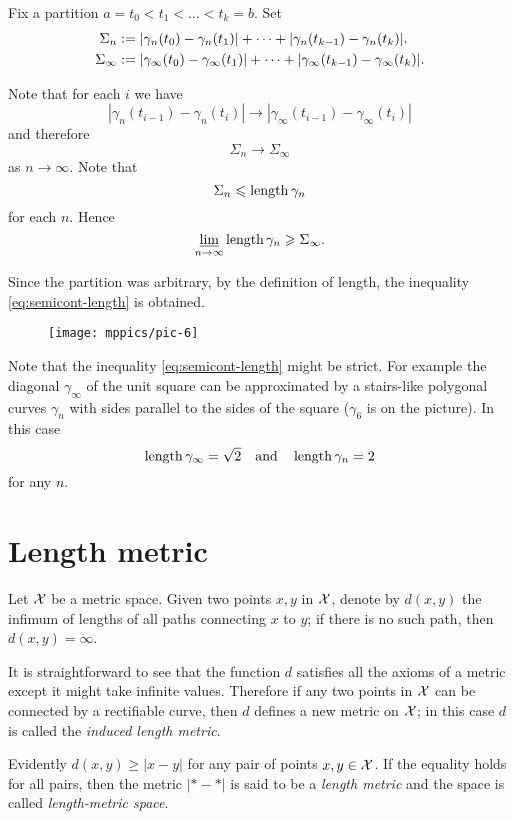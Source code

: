 Fix a partition $a=t_0<t_1<\dots<t_k=b$.
Set 
\begin{align*}\Sigma_n
&:=
|\gamma_n(t_0)-\gamma_n(t_1)|+\dots+|\gamma_n(t_{k-1})-\gamma_n(t_k)|.
\\
\Sigma_\infty
&:=
|\gamma_\infty(t_0)-\gamma_\infty(t_1)|+\dots+|\gamma_\infty(t_{k-1})-\gamma_\infty(t_k)|.
\end{align*}

Note that for each $i$ we have 
\[|\gamma_n(t_{i-1})-\gamma_n(t_i)|\to|\gamma_\infty(t_{i-1})-\gamma_\infty(t_i)|\]
and therefore
\[\Sigma_n\to \Sigma_\infty\] 
as $n\to\infty$.
Note that 
\[\Sigma_n\leqslant\mathop{\rm length}\nolimits\gamma_n\]
for each $n$.
Hence
$$\varliminf_{n\to\infty} \mathop{\rm length}\nolimits\gamma_n \geqslant \Sigma_\infty.$$

  
Since the partition was arbitrary, by the definition of length, the inequality  \ref{eq:semicont-length} is obtained.
\qeds


\begin{wrapfigure}{o}{20 mm}
\vskip-0mm
\centering
\texttt{[image: mppics/pic-6]}
\end{wrapfigure}


Note that the inequality \ref{eq:semicont-length} might be strict.
For example the diagonal $\gamma_\infty$ of the unit square 
can be  approximated by a stairs-like
polygonal curves $\gamma_n$
with sides parallel to the sides of the square ($\gamma_6$ is on the picture).
In this case
\[\mathop{\rm length}\nolimits\gamma_\infty=\sqrt{2}\quad
\text{and}\quad \mathop{\rm length}\nolimits\gamma_n=2\]
for any $n$.



\section{Length metric}\label{sec:Length metric}

Let $\mathcal{X}$ be a metric space.
Given two points $x,y$ in $\mathcal{X}$, denote by $d(x,y)$ the infimum of lengths of all paths connecting $x$ to $y$; if there is no such path, then $d(x,y)=\infty$.

It is straightforward to see that the function $d$ satisfies all the axioms of a metric except it might take infinite values.
Therefore if any two points in $\mathcal{X}$ can be connected by a rectifiable curve, then $d$ defines a new metric on $\mathcal{X}$;
in this case $d$ is called the \emph{induced length metric}.

Evidently $d(x,y)\ge |x-y|$ for any pair of points $x,y\in \mathcal{X}$.
If the equality holds for all pairs, then the metric $|{*}-{*}|$ is said to be a \emph{length metric} and the space is called \emph{length-metric space}.

